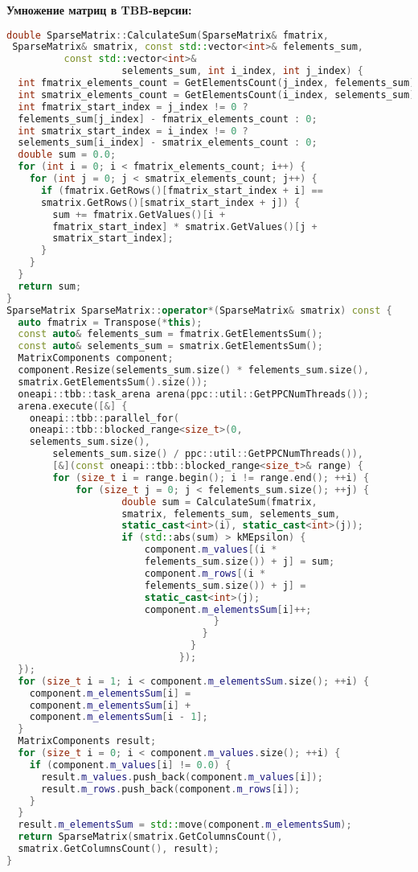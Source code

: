 \documentclass[12pt]{article}
\begin{document}
\textbf{Умножение матриц в TBB-версии:}
\begin{lstlisting}[language=C++]
double SparseMatrix::CalculateSum(SparseMatrix& fmatrix,
 SparseMatrix& smatrix, const std::vector<int>& felements_sum,
          const std::vector<int>& 
                    selements_sum, int i_index, int j_index) {
  int fmatrix_elements_count = GetElementsCount(j_index, felements_sum);
  int smatrix_elements_count = GetElementsCount(i_index, selements_sum);
  int fmatrix_start_index = j_index != 0 ? 
  felements_sum[j_index] - fmatrix_elements_count : 0;
  int smatrix_start_index = i_index != 0 ? 
  selements_sum[i_index] - smatrix_elements_count : 0;
  double sum = 0.0;
  for (int i = 0; i < fmatrix_elements_count; i++) {
    for (int j = 0; j < smatrix_elements_count; j++) {
      if (fmatrix.GetRows()[fmatrix_start_index + i] == 
      smatrix.GetRows()[smatrix_start_index + j]) {
        sum += fmatrix.GetValues()[i + 
        fmatrix_start_index] * smatrix.GetValues()[j + 
        smatrix_start_index];
      }
    }
  }
  return sum;
}
SparseMatrix SparseMatrix::operator*(SparseMatrix& smatrix) const {
  auto fmatrix = Transpose(*this);
  const auto& felements_sum = fmatrix.GetElementsSum();
  const auto& selements_sum = smatrix.GetElementsSum();
  MatrixComponents component;
  component.Resize(selements_sum.size() * felements_sum.size(), 
  smatrix.GetElementsSum().size());
  oneapi::tbb::task_arena arena(ppc::util::GetPPCNumThreads());
  arena.execute([&] {
    oneapi::tbb::parallel_for(
    oneapi::tbb::blocked_range<size_t>(0, 
    selements_sum.size(),
        selements_sum.size() / ppc::util::GetPPCNumThreads()),
        [&](const oneapi::tbb::blocked_range<size_t>& range) {
        for (size_t i = range.begin(); i != range.end(); ++i) {
            for (size_t j = 0; j < felements_sum.size(); ++j) {
                    double sum = CalculateSum(fmatrix, 
                    smatrix, felements_sum, selements_sum,
                    static_cast<int>(i), static_cast<int>(j));
                    if (std::abs(sum) > kMEpsilon) {
                        component.m_values[(i * 
                        felements_sum.size()) + j] = sum;
                        component.m_rows[(i * 
                        felements_sum.size()) + j] = 
                        static_cast<int>(j);
                        component.m_elementsSum[i]++;
                                    }
                                  }
                                }
                              });
  });
  for (size_t i = 1; i < component.m_elementsSum.size(); ++i) {
    component.m_elementsSum[i] = 
    component.m_elementsSum[i] + 
    component.m_elementsSum[i - 1];
  }
  MatrixComponents result;
  for (size_t i = 0; i < component.m_values.size(); ++i) {
    if (component.m_values[i] != 0.0) {
      result.m_values.push_back(component.m_values[i]);
      result.m_rows.push_back(component.m_rows[i]);
    }
  }
  result.m_elementsSum = std::move(component.m_elementsSum);
  return SparseMatrix(smatrix.GetColumnsCount(), 
  smatrix.GetColumnsCount(), result);
}
\end{lstlisting}
\end{document}
